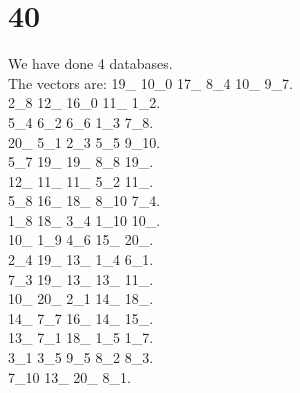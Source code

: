 \chapter{40}
\indent We have done 4 databases.\\
The vectors are:
19\_ 10\_0 17\_ 8\_4 10\_ 9\_7.\\2\_8 12\_ 16\_0 11\_ 1\_2.\\5\_4 6\_2 6\_6 1\_3 7\_8.\\20\_ 5\_1 2\_3 5\_5 9\_10.\\5\_7 19\_ 19\_ 8\_8 19\_.\\12\_ 11\_ 11\_ 5\_2 11\_.\\5\_8 16\_ 18\_ 8\_10 7\_4.\\1\_8 18\_ 3\_4 1\_10 10\_.\\10\_ 1\_9 4\_6 15\_ 20\_.\\2\_4 19\_ 13\_ 1\_4 6\_1.\\7\_3 19\_ 13\_ 13\_ 11\_.\\10\_ 20\_ 2\_1 14\_ 18\_.\\14\_ 7\_7 16\_ 14\_ 15\_.\\13\_ 7\_1 18\_ 1\_5 1\_7.\\3\_1 3\_5 9\_5 8\_2 8\_3.\\7\_10 13\_ 20\_ 8\_1.\\